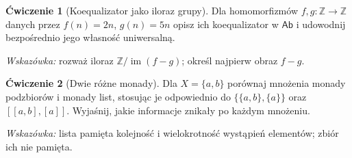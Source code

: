 \documentclass[11pt,a4paper]{article}
\numberwithin{equation}{section}
\theoremstyle{plain}
\theoremstyle{definition}
\newtheorem{cwiczenie}{Ćwiczenie}
\theoremstyle{remark}
\newcommand{\cat}[1]{\mathsf{#1}}
\newcommand{\Ab}{\cat{Ab}}
\newcommand{\im}{\operatorname{im}}
\begin{document}
\begin{cwiczenie}[Koequalizator jako iloraz grupy]
Dla homomorfizmów $f,g:\mathbb Z\to\mathbb Z$ danych przez $f(n)=2n$, $g(n)=5n$ opisz ich koequalizator w $\Ab$ i udowodnij bezpośrednio jego własność uniwersalną.

\emph{Wskazówka:} rozważ iloraz $\mathbb Z/\im(f-g)$; określ najpierw obraz $f-g$.
\end{cwiczenie}

\begin{cwiczenie}[Dwie różne monady]
Dla $X=\{a,b\}$ porównaj mnożenia monady podzbiorów i monady list, stosując je odpowiednio do $\{\{a,b\},\{a\}\}$ oraz $[[a,b],[a]]$. Wyjaśnij, jakie informacje znikały po każdym mnożeniu.

\emph{Wskazówka:} lista pamięta kolejność i wielokrotność wystąpień elementów; zbiór ich nie pamięta.
\end{cwiczenie}
\end{document}

